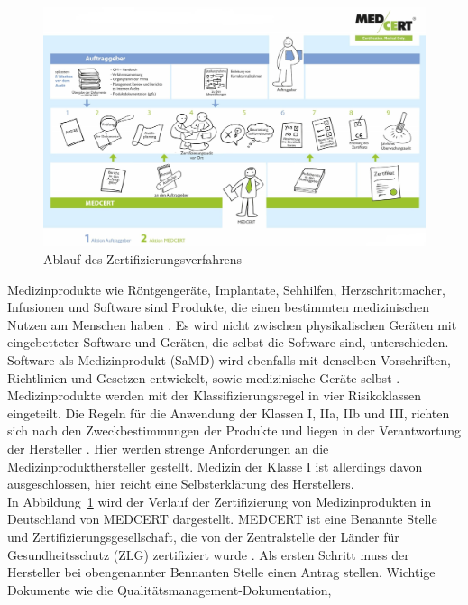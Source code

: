 \begin{figure}[h]
    \centering
    \includegraphics[width=1.0\textwidth]{images/Zertifizierungsablauf.jpg}
    \caption{\label{fig:Zertifizierungsablauf}
        Ablauf des Zertifizierungsverfahrens
        \protect{}
    }
\end{figure}
Medizinprodukte wie Röntgengeräte, Implantate, Sehhilfen, Herzschrittmacher, 
Infusionen und Software sind Produkte, die einen bestimmten medizinischen Nutzen am Menschen haben   \cite{Marktzugangsregelung}.
Es wird nicht zwischen physikalischen Geräten mit eingebetteter Software und Geräten, die selbst die Software sind, unterschieden. 
Software als Medizinprodukt (SaMD) wird ebenfalls mit denselben Vorschriften, Richtlinien und Gesetzen entwickelt, sowie medizinische Geräte selbst \cite{AI_in_EU}.\\
Medizinprodukte werden mit der Klassifizierungsregel in vier Risikoklassen eingeteilt.
Die Regeln für die Anwendung der Klassen I, IIa, IIb und III, 
richten sich nach den Zweckbestimmungen der Produkte und liegen in der Verantwortung der Hersteller  \cite{Marktzugangsregelung}. Hier werden strenge Anforderungen an die Medizinprodukthersteller gestellt. 
Medizin der Klasse I ist allerdings davon ausgeschlossen, hier reicht eine Selbsterklärung des Herstellers.\\
In Abbildung~\ref{fig:Zertifizierungsablauf} wird der Verlauf der Zertifizierung von Medizinprodukten in Deutschland von MEDCERT dargestellt.
MEDCERT ist eine Benannte Stelle und Zertifizierungsgesellschaft,
die von der Zentralstelle der Länder für Gesundheitsschutz (ZLG) zertifiziert wurde \cite{Marktzugangsregelung}.
Als ersten Schritt muss der Hersteller bei obengenannter Bennanten Stelle einen Antrag stellen. Wichtige Dokumente wie die Qualitätsmanagement-Dokumentation,
